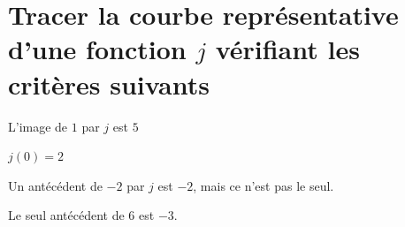 \documentclass{article}
\begin{document}
\section{Tracer la courbe représentative d'une fonction $j$ vérifiant les critères suivants}
\begin{enumquestions}
\item L'image de $1$ par $j$ est $5$
\item $j(0) = 2$
\item Un antécédent de $-2$ par $j$ est $-2$, mais ce n'est pas le seul.
\item Le seul antécédent de $6$ est $-3$.
\end{enumquestions}
\end{document}

